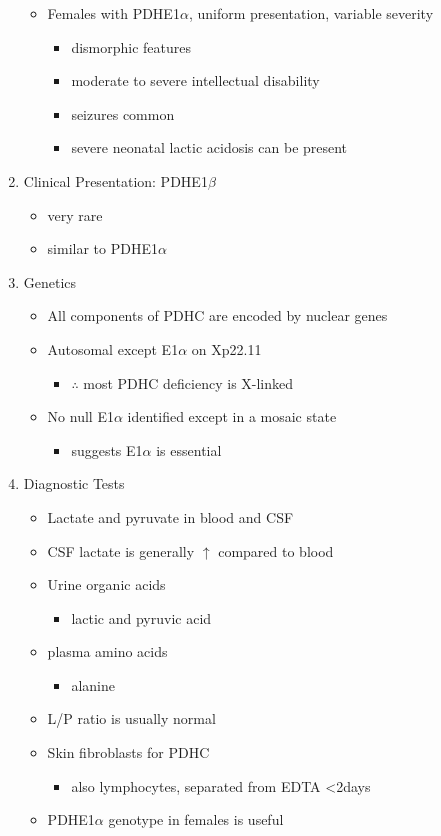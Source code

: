 \documentclass{scrartcl}
\begin{document}
\begin{enumerate}
\begin{itemize}
\item Females with PDHE1\(\alpha\), uniform presentation, variable severity
\begin{itemize}
\item dismorphic features
\item moderate to severe intellectual disability
\item seizures common
\item severe neonatal lactic acidosis can be present
\end{itemize}
\end{itemize}

\item Clinical Presentation: PDHE1\(\beta\)
\label{sec:org739a1e2}
\begin{itemize}
\item very rare
\item similar to PDHE1\(\alpha\)
\end{itemize}

\item Genetics
\label{sec:org3a91366}
\begin{itemize}
\item All components of PDHC are encoded by nuclear genes
\item Autosomal except E1\(\alpha\) on Xp22.11
\begin{itemize}
\item \(\therefore\) most PDHC deficiency is X-linked
\end{itemize}
\item No null E1\(\alpha\) identified except in a mosaic state
\begin{itemize}
\item suggests E1\(\alpha\) is essential
\end{itemize}
\end{itemize}

\item Diagnostic Tests
\label{sec:org0ff9878}
\begin{itemize}
\item Lactate and pyruvate in blood and CSF
\item CSF lactate is generally \(\uparrow\) compared to blood
\item Urine organic acids
\begin{itemize}
\item lactic and pyruvic acid
\end{itemize}
\item plasma amino acids
\begin{itemize}
\item alanine
\end{itemize}
\item L/P ratio is usually normal
\item Skin fibroblasts for PDHC
\begin{itemize}
\item also lymphocytes, separated from EDTA <2days
\end{itemize}
\item PDHE1\(\alpha\) genotype in females is useful
\end{itemize}


\end{enumerate}
\end{document}
